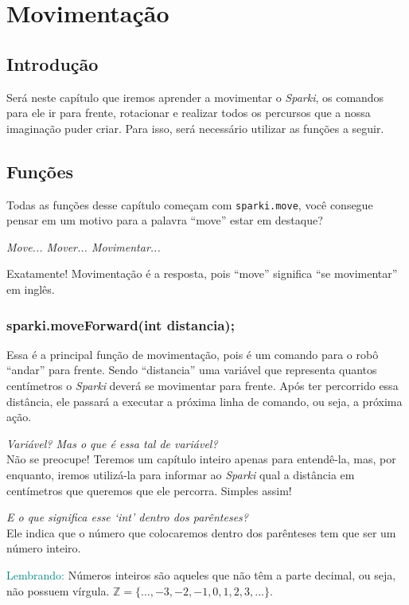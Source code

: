 \chapter{Movimentação}
\section*{Introdução}
    Será neste capítulo que iremos aprender a movimentar o \textsl{Sparki}, os comandos para ele ir para frente, rotacionar e realizar todos os percursos que a nossa imaginação puder criar. Para isso, será necessário utilizar as funções a seguir.
    
\section{Funções}
    Todas as funções desse capítulo começam com \texttt{sparki.move}, você consegue pensar em um motivo para a palavra ``move'' estar em destaque?
    
    \textit{Move... Mover... Movimentar...}
    
    Exatamente! Movimentação é a resposta, pois ``move'' significa ``se movimentar'' em inglês.
    
\subsection{sparki.moveForward(int distancia);}
    Essa é a principal função de movimentação, pois é um comando para o robô ``andar'' para frente. Sendo ``distancia'' uma variável que representa quantos centímetros o \textsl{Sparki} deverá se movimentar para frente. Após ter percorrido essa distância, ele passará a executar a próxima linha de comando, ou seja, a próxima ação.
    
    \textit{Variável? Mas o que é essa tal de variável?} \\
    Não se preocupe! Teremos um capítulo inteiro apenas para entendê-la, mas, por enquanto, iremos utilizá-la para informar ao \textsl{Sparki} qual a distância em centímetros que queremos que ele percorra. Simples assim!
    
    \textit{E o que significa esse `int' dentro dos parênteses?} \\
    Ele indica que o número que colocaremos dentro dos parênteses tem que ser um número inteiro.
    \begin{center}
    \textcolor{teal}{Lembrando:} Números inteiros são aqueles que não têm a parte decimal, ou seja, não possuem vírgula. $\mathbb{Z}=\{..., -3, -2, -1, 0, 1, 2, 3, ...\}$.
    \end{center}
    

